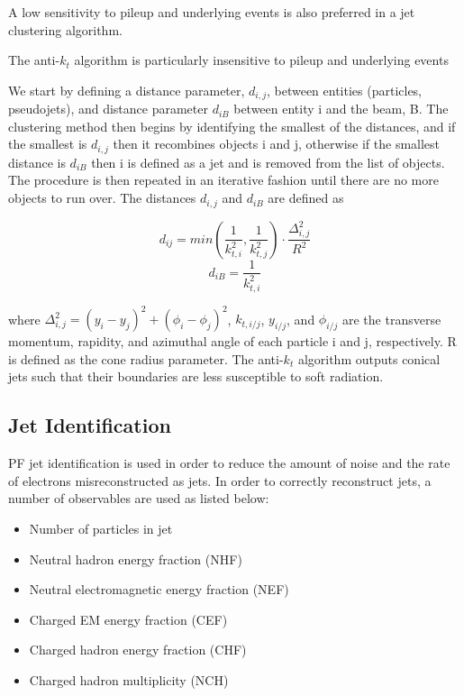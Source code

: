 A low sensitivity to pileup and underlying events is also preferred in a jet clustering algorithm.

The anti-$k_t$ algorithm is particularly insensitive to pileup and underlying events

We start by defining a distance parameter, $d_{i,j}$, between entities (particles, pseudojets), and distance parameter $d_{iB}$ between entity i and the beam, B. The clustering method then begins by identifying the smallest of the distances, and if the smallest is $d_{i,j}$ then it recombines objects i and j, otherwise if the smallest distance is $d_{iB}$ then i is defined as a jet and is removed from the list of objects. The procedure is then repeated in an iterative fashion until there are no more objects to run over. The distances $d_{i,j}$ and $d_{iB}$ are defined as

\begin{equation}
d_{ij} = min\left(\frac{1}{k^2_{t,i}}, \frac{1}{k^2_{t,j}} \right) \cdot \frac{\Delta^2_{i,j}}{R^2}
\end{equation}
\begin{equation}
d_{iB} = \frac{1}{k^2_{t,i}}
\end{equation}

where $\Delta^2_{i,j} = (y_i - y_j)^2 + (\phi_i - \phi_j)^2$, $k_{t,i/j}$, $y_{i/j}$, and $\phi_{i/j}$ are the transverse momentum, rapidity, and azimuthal angle of each particle i and j, respectively. R is defined as the cone radius parameter. The anti-$k_t$ algorithm outputs conical jets such that their boundaries are less susceptible to soft radiation.

\subsection{Jet Identification} \label{subsec-JetIdentification}

PF jet identification is used in order to reduce the amount of noise and the rate of electrons misreconstructed as jets. In order to correctly reconstruct jets, a number of observables are used as listed below:

\begin{itemize}
	\item Number of particles in jet 
	\item Neutral hadron energy fraction (NHF) 
	\item Neutral electromagnetic energy fraction (NEF)
	\item Charged EM energy fraction (CEF)
	\item Charged hadron energy fraction (CHF)
	\item Charged hadron multiplicity (NCH)
\end{itemize}	

